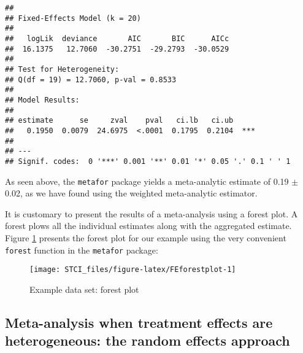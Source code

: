 \documentclass[]{book}
\newenvironment{Shaded}{\begin{snugshade}}{\end{snugshade}}
\newcommand{\DataTypeTok}[1]{\textcolor[rgb]{0.13,0.29,0.53}{#1}}
\newcommand{\KeywordTok}[1]{\textcolor[rgb]{0.13,0.29,0.53}{\textbf{#1}}}
\newcommand{\NormalTok}[1]{#1}
\newcommand{\OperatorTok}[1]{\textcolor[rgb]{0.81,0.36,0.00}{\textbf{#1}}}
\newcommand{\StringTok}[1]{\textcolor[rgb]{0.31,0.60,0.02}{#1}}
\theoremstyle{definition}
\theoremstyle{definition}
\theoremstyle{definition}
\theoremstyle{remark}
\begin{document}
\begin{verbatim}
## 
## Fixed-Effects Model (k = 20)
## 
##   logLik  deviance       AIC       BIC      AICc 
##  16.1375   12.7060  -30.2751  -29.2793  -30.0529   
## 
## Test for Heterogeneity:
## Q(df = 19) = 12.7060, p-val = 0.8533
## 
## Model Results:
## 
## estimate      se     zval    pval   ci.lb   ci.ub 
##   0.1950  0.0079  24.6975  <.0001  0.1795  0.2104  *** 
## 
## ---
## Signif. codes:  0 '***' 0.001 '**' 0.01 '*' 0.05 '.' 0.1 ' ' 1
\end{verbatim}

As seen above, the \texttt{metafor} package yields a meta-analytic estimate of 0.19 \(\pm\) 0.02, as we have found using the weighted meta-analytic estimator.

It is customary to present the results of a meta-analysis using a forest plot.
A forest plows all the individual estimates along with the aggregated estimate.
Figure \ref{fig:FEforestplot} presents the forest plot for our example using the very convenient \texttt{forest} function in the \texttt{metafor} package:

\begin{Shaded}
\end{Shaded}

\begin{figure}[htbp]

{\centering \texttt{[image: STCI\_files/figure-latex/FEforestplot-1]} 

}

\caption{Example data set: forest plot}\label{fig:FEforestplot}
\end{figure}

\hypertarget{meta-analysis-when-treatment-effects-are-heterogeneous-the-random-effects-approach}{%
\subsection{Meta-analysis when treatment effects are heterogeneous: the random effects approach}\label{meta-analysis-when-treatment-effects-are-heterogeneous-the-random-effects-approach}}
\end{document}

